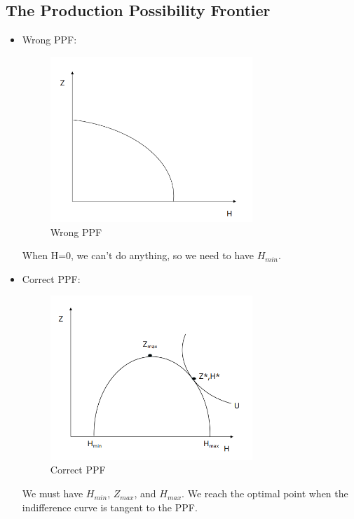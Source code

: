 \subsection{The Production Possibility Frontier}
\begin{itemize}

\item Wrong PPF:

        \begin{figure}[H]%
                \centering
                \includegraphics[width=3in]{images/ch3/23.png}
                \caption{Wrong PPF}
                \label{fig:label}
            \end{figure}

When H=0, we can't do anything, so we need to have $H_{min}$. 

\item Correct PPF:

\begin{figure}[H]%
                \centering
                \includegraphics[width=3in]{images/ch3/24.png}
                \caption{Correct PPF}
                \label{fig:label}
            \end{figure}

We must have $H_{min}$, $Z_{max}$, and $H_{max}$.  We reach the optimal point when the indifference curve is tangent to the PPF.
\end{itemize} 

